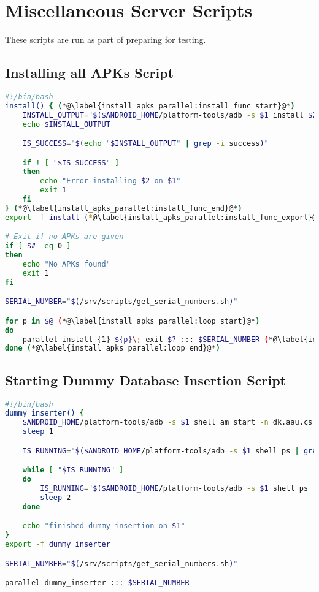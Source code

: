 \chapter{Miscellaneous Server Scripts}\label{app:miscscripts}
These scripts are run as part of preparing for testing.

\section{Installing all APKs Script}\label{app:install_apks}
\begin{lstlisting}[language=bash,caption=Script that install APKs on all connected devices in parallel,label=lst:install_apks_parallel]
#!/bin/bash
install() { (*@\label{install_apks_parallel:install_func_start}@*)
    INSTALL_OUTPUT="$($ANDROID_HOME/platform-tools/adb -s $1 install $2)"
    echo $INSTALL_OUTPUT

    IS_SUCCESS="$(echo "$INSTALL_OUTPUT" | grep -i success)"

    if ! [ "$IS_SUCCESS" ]
    then
        echo "Error installing $2 on $1"
        exit 1
    fi
} (*@\label{install_apks_parallel:install_func_end}@*)
export -f install (*@\label{install_apks_parallel:install_func_export}@*)

# Exit if no APKs are given
if [ $# -eq 0 ]
then
    echo "No APKs found"
    exit 1
fi

SERIAL_NUMBER="$(/srv/scripts/get_serial_numbers.sh)"

for p in $@ (*@\label{install_apks_parallel:loop_start}@*)
do
    parallel install {1} ${p}\; exit $? ::: $SERIAL_NUMBER (*@\label{install_apks_parallel:parallel_loop}@*)
done (*@\label{install_apks_parallel:loop_end}@*)
\end{lstlisting}

\section{Starting Dummy Database Insertion Script}\label{app:start_wait_db_inserter_parallel}
\begin{lstlisting}[language=bash,caption=Script that starts and waits for the dummy database insertion app in parallel on all connected devices,label=lst:start_wait_db_inserter_parallel]
#!/bin/bash
dummy_inserter() {
    $ANDROID_HOME/platform-tools/adb -s $1 shell am start -n dk.aau.cs.giraf.dummydbinserter/dk.aau.cs.giraf.dummydbinserter.MainActivity
    sleep 1

    IS_RUNNING="$($ANDROID_HOME/platform-tools/adb -s $1 shell ps | grep dk.aau.cs.giraf.dummydbinserter)"

    while [ "$IS_RUNNING" ]
    do
        IS_RUNNING="$($ANDROID_HOME/platform-tools/adb -s $1 shell ps | grep dk.aau.cs.giraf.dummydbinserter)"
        sleep 2
    done

    echo "finished dummy insertion on $1"
}
export -f dummy_inserter

SERIAL_NUMBER="$(/srv/scripts/get_serial_numbers.sh)"

parallel dummy_inserter ::: $SERIAL_NUMBER

\end{lstlisting}